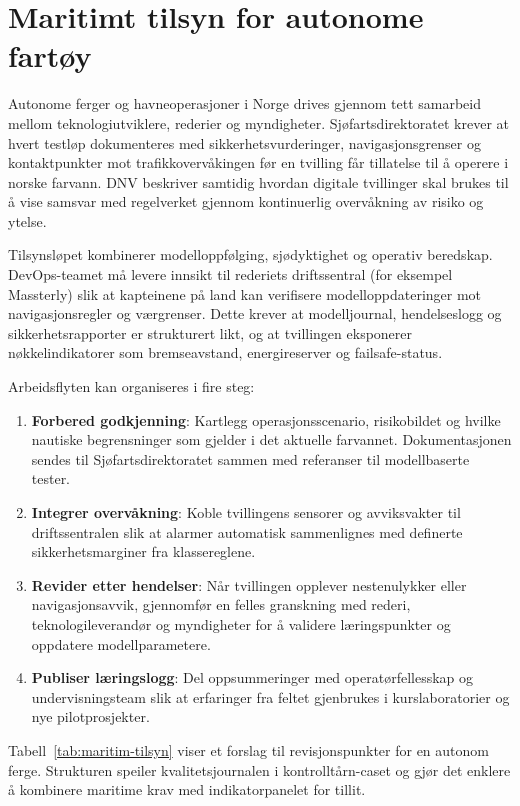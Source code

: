 \section{Maritimt tilsyn for autonome fartøy}
Autonome ferger og havneoperasjoner i Norge drives gjennom tett samarbeid mellom teknologiutviklere, rederier og myndigheter. Sjøfartsdirektoratet krever at hvert testløp dokumenteres med sikkerhetsvurderinger, navigasjonsgrenser og kontaktpunkter mot trafikkovervåkingen før en tvilling får tillatelse til å operere i norske farvann.\citep{sdir2023autonomefartoy} DNV beskriver samtidig hvordan digitale tvillinger skal brukes til å vise samsvar med regelverket gjennom kontinuerlig overvåkning av risiko og ytelse.\citep{dnv2024autonomous} 

Tilsynsløpet kombinerer modelloppfølging, sjødyktighet og operativ beredskap. DevOps-teamet må levere innsikt til rederiets driftssentral (for eksempel Massterly) slik at kapteinene på land kan verifisere modelloppdateringer mot navigasjonsregler og værgrenser.\citep{massterly2023operations} Dette krever at modelljournal, hendelseslogg og sikkerhetsrapporter er strukturert likt, og at tvillingen eksponerer nøkkelindikatorer som bremseavstand, energireserver og failsafe-status.

Arbeidsflyten kan organiseres i fire steg:
\begin{enumerate}
    \item \textbf{Forbered godkjenning}: Kartlegg operasjonsscenario, risikobildet og hvilke nautiske begrensninger som gjelder i det aktuelle farvannet. Dokumentasjonen sendes til Sjøfartsdirektoratet sammen med referanser til modellbaserte tester.
    \item \textbf{Integrer overvåkning}: Koble tvillingens sensorer og avviksvakter til driftssentralen slik at alarmer automatisk sammenlignes med definerte sikkerhetsmarginer fra klassereglene.
    \item \textbf{Revider etter hendelser}: Når tvillingen opplever nestenulykker eller navigasjonsavvik, gjennomfør en felles granskning med rederi, teknologileverandør og myndigheter for å validere læringspunkter og oppdatere modellparametere.
    \item \textbf{Publiser læringslogg}: Del oppsummeringer med operatørfellesskap og undervisningsteam slik at erfaringer fra feltet gjenbrukes i kurslaboratorier og nye pilotprosjekter.
\end{enumerate}

Tabell~\ref{tab:maritim-tilsyn} viser et forslag til revisjonspunkter for en autonom ferge. Strukturen speiler kvalitetsjournalen i kontrolltårn-caset og gjør det enklere å kombinere maritime krav med indikatorpanelet for tillit.

